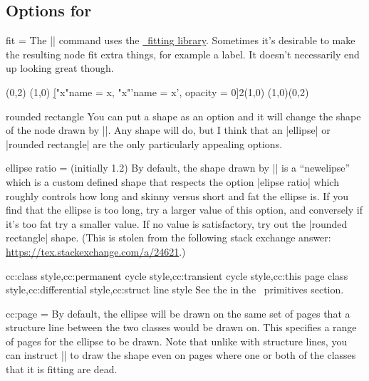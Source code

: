 \begin{sseqdata}[name = basic, cohomological Serre grading]
\subsection{Options for \sectionstring\circleclass}
\begin{key}{fit = }
The |\circleclasses| command uses the \href{\pgfmanualurl#section.52}{\tikzpkg\  fitting library}. Sometimes it's desirable to make the resulting node fit extra things, for example a label. It doesn't necessarily end up looking great though.
\begin{codeexample}[]
\begin{sseqpage}[ Adams grading, axes gap = 0.7cm ]
\class(0,2)
\class(1,0)
\d["x"{name = x}, "x"'{name = x', opacity = 0}]2(1,0)
\circleclasses[fit = (x)(x'), rounded rectangle](1,0)(0,2)
\end{sseqpage}
\end{codeexample}
\end{key}

\begin{key}{rounded rectangle}
You can put a shape as an option and it will change the shape of the node drawn by |\circleclasses|. Any shape will do, but I think that an |ellipse| or |rounded rectangle| are the only particularly appealing options.
\end{key}

\begin{key}{ellipse ratio =  (initially 1.2)}
By default, the shape drawn by |\circleclasses| is a ``newelipse'' which is a custom defined shape that respects the option |elipse ratio| which roughly controls how long and skinny versus short and fat the ellipse is. If you find that the ellipse is too long, try a larger value of this option, and conversely if it's too fat try a smaller value. If no value is satisfactory, try out the |rounded rectangle| shape. (This is stolen from the following stack exchange answer: \url{https://tex.stackexchange.com/a/24621}.)
\end{key}

\begin{keylist}{cc:class style,cc:permanent cycle style,cc:transient cycle style,cc:this page class style,cc:differential style,cc:struct line style}
See the  in the \tikzpkg\  primitives section.
\end{keylist}

\begin{key}{cc:page = }
By default, the ellipse will be drawn on the same set of pages that a structure line between the two classes would be drawn on. This specifies a range of pages for the ellipse to be drawn. Note that unlike with structure lines, you can instruct |\circleclasses| to draw the shape even on pages where one or both of the classes that it is fitting are dead.
\end{key}


\end{sseqdata}
